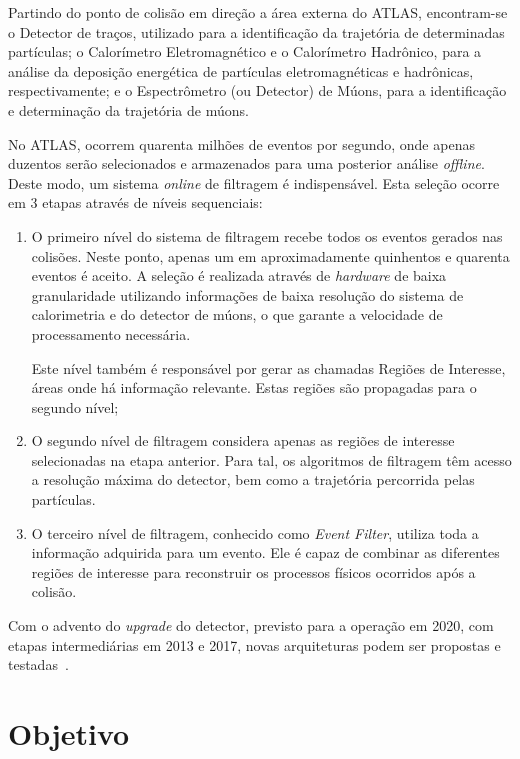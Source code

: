 Partindo do ponto de colisão em direção a área externa do ATLAS, encontram-se o
Detector de traços, utilizado para a identificação da trajetória de determinadas
partículas; o Calorímetro Eletromagnético e o Calorímetro Hadrônico, para a
análise da deposição energética de partículas eletromagnéticas e hadrônicas,
respectivamente; e o Espectrômetro (ou Detector) de Múons, para a identificação
e determinação da trajetória de múons.

No ATLAS, ocorrem quarenta milhões de eventos por segundo, onde apenas duzentos
serão selecionados e armazenados para uma posterior análise \emph{offline}.
Deste modo, um sistema \emph{online} de filtragem é indispensável. Esta
seleção ocorre em 3 etapas através de níveis sequenciais:

\begin{enumerate}

    \item O primeiro nível do sistema de filtragem recebe todos os eventos
    gerados nas colisões. Neste ponto, apenas um em aproximadamente quinhentos e
    quarenta eventos é aceito.  A seleção é realizada através de \emph{hardware}
    de baixa granularidade utilizando informações de baixa resolução do sistema
    de calorimetria e do detector de múons, o que garante a velocidade de
    processamento necessária.

    Este nível também é responsável por gerar as chamadas Regiões de Interesse,
    áreas onde há informação relevante. Estas regiões são propagadas para o
    segundo nível;

    \item O segundo nível de filtragem considera apenas as regiões de interesse
    selecionadas na etapa anterior. Para tal, os algoritmos de filtragem têm
    acesso a resolução máxima do detector, bem como a trajetória percorrida
    pelas partículas.

    \item O terceiro nível de filtragem, conhecido como \emph{Event Filter},
    utiliza toda a informação adquirida para um evento. Ele é capaz de combinar
    as diferentes regiões de interesse para reconstruir os processos físicos
    ocorridos após a colisão.
\end{enumerate}

Com o advento do \emph{upgrade} do detector, previsto para a operação em 2020,
com etapas intermediárias em 2013 e 2017, novas arquiteturas podem ser propostas
e testadas~\cite{TSENG2008}.

\section{Objetivo}

